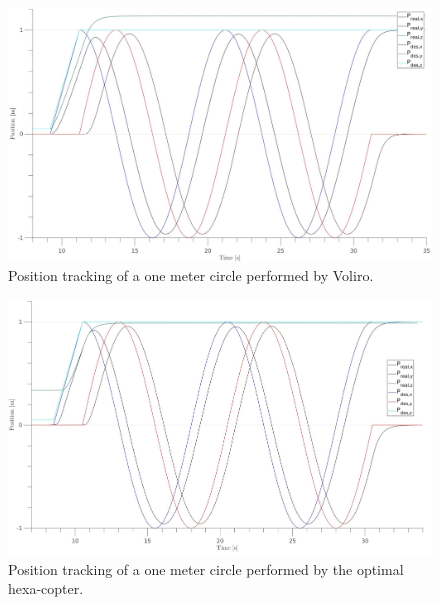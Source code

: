 \begin{figure}[!ht]
  \begin{center}
    \includegraphics[width=1.0\linewidth]{images/Voliro_circle_position.jpg}
    \caption{Position tracking of a one meter circle performed by Voliro.}
    \label{fig:Voliro_position_circle}
  \end{center}
\end{figure}

\begin{figure}[!ht]
  \begin{center}
    \includegraphics[width=1.0\linewidth]{images/Hexa_circle_position.jpg}
    \caption{Position tracking of a one meter circle performed by the optimal hexa-copter.}
    \label{fig:Hexa_position_circle}
  \end{center}
\end{figure}

